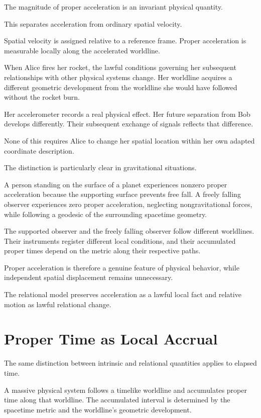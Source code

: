 \documentclass[12pt,onecolumn]{article}
\begin{document}
The magnitude of proper acceleration is an invariant physical quantity.

This separates acceleration from ordinary spatial velocity.

Spatial velocity is assigned relative to a reference frame. Proper acceleration is measurable locally along the accelerated worldline.

When Alice fires her rocket, the lawful conditions governing her subsequent relationships with other physical systems change. Her worldline acquires a different geometric development from the worldline she would have followed without the rocket burn.

Her accelerometer records a real physical effect. Her future separation from Bob develops differently. Their subsequent exchange of signals reflects that difference.

None of this requires Alice to change her spatial location within her own adapted coordinate description.

The distinction is particularly clear in gravitational situations.

A person standing on the surface of a planet experiences nonzero proper acceleration because the supporting surface prevents free fall. A freely falling observer experiences zero proper acceleration, neglecting nongravitational forces, while following a geodesic of the surrounding spacetime geometry.

The supported observer and the freely falling observer follow different worldlines. Their instruments register different local conditions, and their accumulated proper times depend on the metric along their respective paths.

Proper acceleration is therefore a genuine feature of physical behavior, while independent spatial displacement remains unnecessary.

The relational model preserves acceleration as a lawful local fact and relative motion as lawful relational change.

\section{Proper Time as Local Accrual}

The same distinction between intrinsic and relational quantities applies to elapsed time.

A massive physical system follows a timelike worldline and accumulates proper time along that worldline. The accumulated interval is determined by the spacetime metric and the worldline's geometric development.
\end{document}
